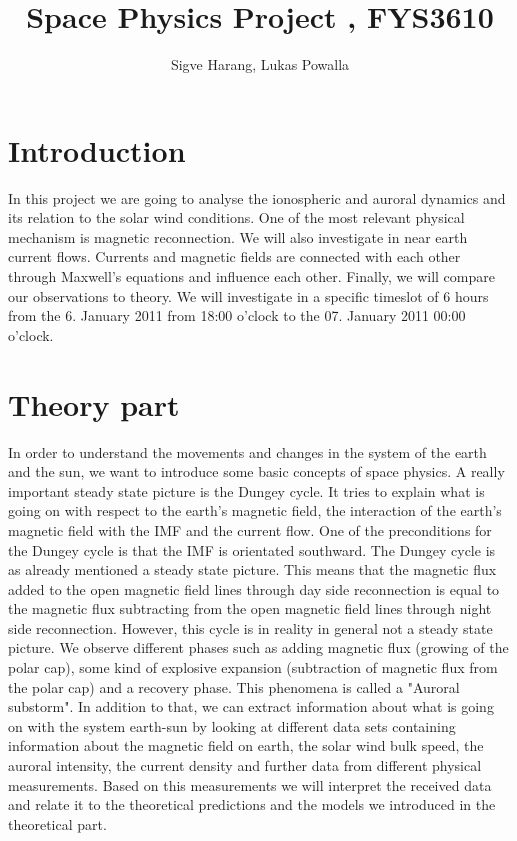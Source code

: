 \documentclass[10pt,a4paper]{article}
\author{Sigve Harang, Lukas Powalla}
\title{Space Physics Project , FYS3610}
\begin{document}
\maketitle
\newpage
\tableofcontents
\newpage
\section*{Introduction}
In this project we are going to analyse the ionospheric and auroral dynamics and its relation to the solar wind conditions. One of the most relevant physical mechanism is magnetic reconnection. We will also investigate in near earth current flows. Currents and magnetic fields are connected with each other through Maxwell's equations and influence each other. Finally, we will compare our observations to theory. We will investigate in a specific timeslot of 6 hours from the 6. January 2011 from 18:00 o'clock to the 07. January 2011 00:00 o'clock.   
\section{Theory part}
In order to understand the movements and changes in the system of the earth and the sun, we want to introduce some basic concepts of space physics. 
A really important steady state picture is the Dungey cycle. It tries to explain what is going on with respect to the earth's magnetic field, the interaction of the earth's magnetic field with the IMF and the current flow. One of the preconditions for the Dungey cycle is that the IMF is orientated southward. 
The Dungey cycle is as already mentioned a steady state picture. This means that the magnetic flux added to the open magnetic field lines through day side reconnection is equal to the magnetic flux subtracting from the open magnetic field lines through night side reconnection.
However, this cycle is in reality in general not a steady state picture. We observe different phases such as adding magnetic flux (growing of the polar cap), some kind of explosive expansion (subtraction of magnetic flux from the polar cap) and a recovery phase. This phenomena is called a "Auroral substorm". In addition to that, we can extract information about what is going on with the system earth-sun by looking at different data sets containing information about the magnetic field on earth, the solar wind bulk speed, the auroral intensity, the current density and further data from different physical measurements. 
Based on this measurements we will interpret the received data and relate it to the theoretical predictions and the models we introduced in the theoretical part.
\end{document}

